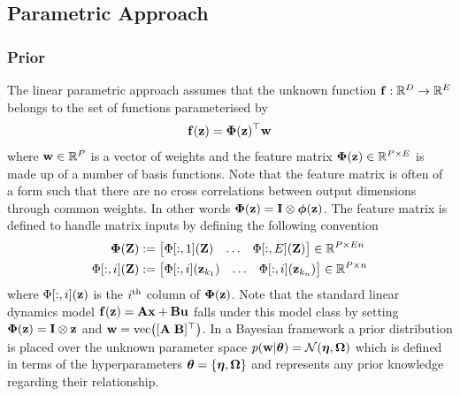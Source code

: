\subsection{Parametric Approach}
\subsubsection{Prior}
The linear parametric approach assumes that the unknown function $\mathbf{f}: \mathbb{R}^D \rightarrow \mathbb{R}^E$ belongs to the set of functions parameterised by
\begin{equation}
\mathbf{f}(\mathbf{z}) = \boldsymbol{\Phi}(\mathbf{z})^\top \mathbf{w}    \label{eqn:param}
\end{equation}
where $\mathbf{w} \in \mathbb{R}^{P}$ is a vector of weights and the feature matrix $\boldsymbol{\Phi}(\mathbf{z}) \in \mathbb{R}^{P\times E}$ is made up of a number of basis functions. Note that the feature matrix is often of a form such that there are no cross correlations between output dimensions through common weights. In other words $\boldsymbol{\Phi}(\mathbf{z}) = \mathbf{I} \otimes \boldsymbol{\phi}(\mathbf{z})$. The feature matrix is defined to handle matrix inputs by defining the following convention
\begin{align}
\boldsymbol{\Phi}(\mathbf{Z}) &:= \begin{bmatrix}  \Phi[:,1](\mathbf{Z}) & \dots & \Phi[:,E](\mathbf{Z})  \end{bmatrix} \in \mathbb{R}^{P \times En}
\label{eqn:Phi1} \\
\Phi[:,i](\mathbf{Z}) &:= \begin{bmatrix}  \Phi[:,i](\mathbf{z}_{k_1}) & \dots & \Phi[:,i](\mathbf{z}_{k_n})  \end{bmatrix} \in \mathbb{R}^{P \times n}
\label{eqn:Phi2}
\end{align}
 where $\Phi[:,i](\mathbf{z})$ is the $i^{\text{th}}$ column of $\boldsymbol{\Phi}(\mathbf{z})$. Note that the standard linear dynamics model $\mathbf{f}(\mathbf{z}) = \mathbf{A}\mathbf{x} +\mathbf{B}\mathbf{u}$ falls under this model class by setting $\boldsymbol{\Phi}(\mathbf{z}) = \mathbf{I} \otimes \mathbf{z}$ and $\mathbf{w} = \mathrm{vec}\big([\mathbf{A} \;\mathbf{B}]^\top\big)$. In a Bayesian framework a prior distribution is placed over the unknown parameter space $p(\mathbf{w}|\boldsymbol{\theta}) = \mathcal{N}(\boldsymbol{\eta},\boldsymbol{\Omega})$ which is defined in terms of the hyperparameters $\boldsymbol{\theta} = \{\boldsymbol{\eta},\boldsymbol{\Omega}\}$ and represents any prior knowledge regarding their relationship. 

